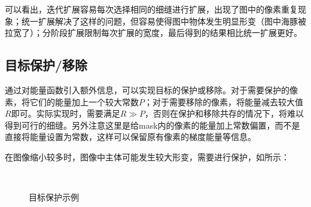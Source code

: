 \documentclass[twoside,a4paper,4pt]{article}
\begin{document}
可以看出，迭代扩展容易每次选择相同的细缝进行扩展，出现了图中的像素重复现象；统一扩展解决了这样的问题，但容易使得图中物体发生明显形变（图中海豚被拉宽了）；分阶段扩展限制每次扩展的宽度，最后得到的结果相比统一扩展更好。
\subsection{目标保护/移除}
通过对能量函数引入额外信息，可以实现目标的保护或移除。对于需要保护的像素，将它们的能量加上一个较大常数$P$；对于需要移除的像素，将能量减去较大值$R$即可。实际实现时，需要满足$R \gg P$，否则在保护和移除共存的情况下，将难以得到可行的细缝。另外注意这里是给mask内的像素的能量加上常数偏置，而不是直接将能量设置为常数，这样可以保留原有像素的梯度能量等信息。\par
在图像缩小较多时，图像中主体可能发生较大形变，需要进行保护，如所示：
\begin{figure}[H]
    \centering
    \\
    \caption{目标保护示例}
    \label{fig:ratatouille}
\end{figure}\par
\end{document}
